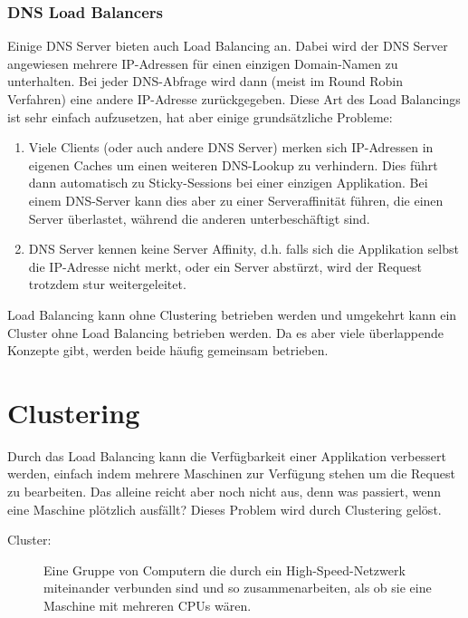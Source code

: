 \documentclass[a4paper,10pt]{scrreprt}
\begin{document}
\subsection{DNS Load Balancers} %
\label{sub:dns_load_balancers}
Einige DNS Server bieten auch Load Balancing an. Dabei wird der DNS Server angewiesen mehrere IP-Adressen
für einen einzigen Domain-Namen zu unterhalten. Bei jeder DNS-Abfrage wird dann (meist im Round Robin
Verfahren) eine andere IP-Adresse zurückgegeben. Diese Art des Load Balancings ist sehr einfach aufzusetzen,
hat aber einige grundsätzliche Probleme:
\begin{enumerate}
	\item Viele Clients (oder auch andere DNS Server) merken sich IP-Adressen in eigenen Caches um einen
weiteren DNS-Lookup zu verhindern. Dies führt dann automatisch zu Sticky-Sessions bei einer einzigen
Applikation. Bei einem DNS-Server kann dies aber zu einer Serveraffinität führen, die einen Server
überlastet, während die anderen unterbeschäftigt sind.
\item DNS Server kennen keine Server Affinity, d.h. falls sich die Applikation selbst die IP-Adresse nicht merkt,
oder ein Server abstürzt, wird der Request trotzdem stur weitergeleitet.
\end{enumerate}

\begin{framed}
Load Balancing kann ohne Clustering betrieben werden und umgekehrt kann ein Cluster ohne Load Balancing
betrieben werden. Da es aber viele überlappende Konzepte gibt, werden beide häufig gemeinsam betrieben.

\end{framed}

\chapter{Clustering} %
\label{cha:clustering}
Durch das Load Balancing kann die Verfügbarkeit einer Applikation verbessert werden, einfach indem mehrere
Maschinen zur Verfügung stehen um die Request zu bearbeiten. Das alleine reicht aber noch nicht aus, denn
was passiert, wenn eine Maschine plötzlich ausfällt? Dieses Problem wird durch Clustering gelöst.
\begin{description}
	\item[Cluster:] Eine Gruppe von Computern die durch ein High-Speed-Netzwerk miteinander verbunden
sind und so zusammenarbeiten, als ob sie eine Maschine mit mehreren CPUs wären.

\end{description}
\end{document}
